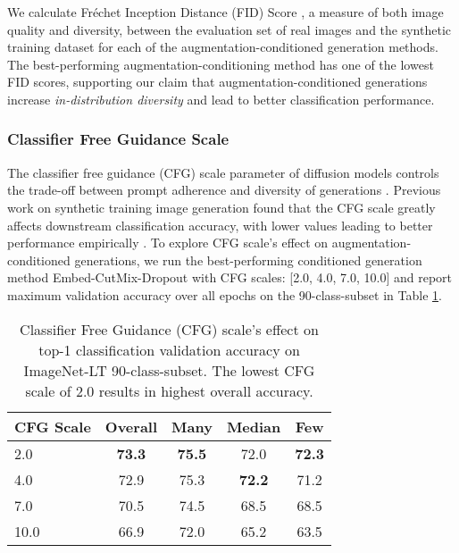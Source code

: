 We calculate Fréchet Inception Distance (FID) Score \citep{fid}, a measure of both image quality and diversity, between the evaluation set of real images and the synthetic training dataset for each of the augmentation-conditioned generation methods. 
The best-performing augmentation-conditioning method has one of the lowest FID scores, supporting our claim that augmentation-conditioned generations increase \emph{in-distribution diversity} and lead to better classification performance.

\subsubsection{Classifier Free Guidance Scale} \label{sec:90_cfg}
\vspace{-0.2cm}

The classifier free guidance (CFG) scale parameter of diffusion models controls the trade-off between prompt adherence and diversity of generations \citep{classifierfreeguidance}. 
Previous work on synthetic training image generation found that the CFG scale greatly affects downstream classification accuracy, with lower values leading to better performance empirically \citep{syntheticscaling, stable_rep, fake_it}. 
To explore CFG scale's effect on augmentation-conditioned generations, we run the best-performing conditioned generation method Embed-CutMix-Dropout with CFG scales: [2.0, 4.0, 7.0, 10.0] and report maximum validation accuracy over all epochs on the 90-class-subset in Table \ref{table:90_cfg}. 

\vspace{-0.5cm}
\begin{table}[h]
\centering
\small
\caption{Classifier Free Guidance (CFG) scale's effect on top-1 classification validation accuracy on ImageNet-LT 90-class-subset. The lowest CFG scale of 2.0 results in highest overall accuracy.}
\vspace{0.2cm}
\begin{tabular}{lcccc}
\toprule
\textbf{CFG Scale} & \textbf{Overall} & \textbf{Many} & \textbf{Median} & \textbf{Few}\\
\midrule
\midrule
2.0 & \textbf{73.3} & \textbf{75.5} & 72.0 & \textbf{72.3} \\
4.0 & 72.9 & 75.3 & \textbf{72.2} & 71.2 \\
7.0 & 70.5 & 74.5 & 68.5 & 68.5 \\ 
10.0 & 66.9 & 72.0 & 65.2 & 63.5 \\
\bottomrule
\end{tabular}
\label{table:90_cfg}
\end{table} 

